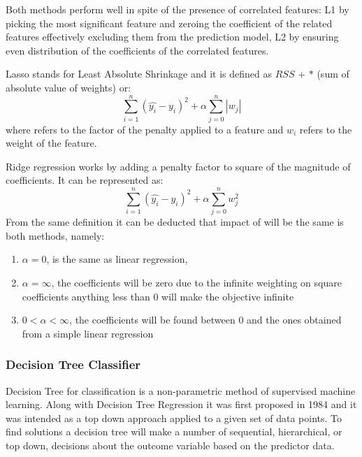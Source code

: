 Both methods perform well in spite of the presence of correlated features: L1 by picking the most significant feature and zeroing the coefficient of the related features effectively excluding them from the prediction model, L2 by ensuring even distribution of the coefficients of the correlated features. 

Lasso stands for Least Absolute Shrinkage and it is defined as $RSS$ $+$ \textalpha{} $*$ (sum of absolute value of weights) or:
\begin{equation}\label{eq_lasso}
\sum^n_{i=1}(\hat{y_i}- y_i)^2 + \alpha \sum^n_{j=0}|w_j|
\end{equation}
where \textalpha{} refers to the factor of the penalty applied to a feature and $w_i$ refers to the weight of the feature\cite{Hastie2009SpringerOfLasso}.

Ridge regression works by adding a penalty factor to square of the magnitude of coefficients\cite{Hastie2009SpringerOfRidge}. It can be represented as:
\begin{equation}\label{eq_ridge}
\sum^n_{i=1}(\hat{y_i}- y_i)^2 + \alpha \sum^n_{j=0}w_j^2
\end{equation}
From the same definition it can be deducted that impact of \textalpha{} will be the same is both methods, namely:
\begin{enumerate}\label{list:impact-of-alpha}
\itemsep0em
\item\label{it:item1} $\alpha = 0$, is the same as linear regression, 
\item\label{it:item2} $\alpha = \infty$, the coefficients will be zero due to the infinite weighting on square coefficients anything less than 0 will make the objective infinite
\item\label{it:item3} $0 < \alpha < \infty$, the coefficients will be found between 0 and the ones obtained from a simple linear regression
\end{enumerate}

\subsubsection{Decision Tree Classifier}
Decision Tree for classification is a non-parametric method of supervised machine learning. Along with Decision Tree Regression it was first proposed in 1984\cite{BreimanCart1984} and it was intended as a top down approach applied to a given set of data points. To find solutions a decision tree will make a number of sequential, hierarchical, or top down, decisions about the outcome variable based on the predictor data. 

